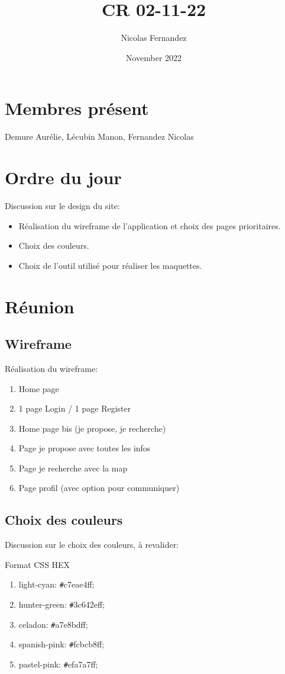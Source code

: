 \documentclass{report}
\title{CR 02-11-22}
\author{Nicolas Fernandez}
\date{November 2022}
\begin{document}
\maketitle

\section{Membres présent}
Demure Aurélie, Lécubin Manon, Fernandez Nicolas

\section{Ordre du jour}

Discussion sur le design du site:

\begin{itemize}
    \item Réalisation du wireframe de l'application et choix des pages prioritaires.
    \item Choix des couleurs.
    \item Choix de l'outil utilisé pour réaliser les maquettes.
\end{itemize}

\section{Réunion}
\subsection{Wireframe}

Réalisation du wireframe:
\begin{enumerate}
    \item Home page
    \item 1 page Login / 1 page Register
    \item Home page bis (je propose, je recherche)
    \item Page je propose avec toutes les infos
    \item Page je recherche avec la map
    \item Page profil (avec option pour communiquer)
\end{enumerate}

\subsection{Choix des couleurs}
Discussion sur le choix des couleurs, à 
revalider:

\vspace{5mm}
Format CSS HEX
\begin{enumerate}
    \item  light-cyan: \verb|#|c7eae4ff;
    \item  hunter-green: \verb|#|3c642eff;
    \item  celadon: \verb|#|a7e8bdff;
    \item  spanish-pink: \verb|#|fcbcb8ff;
    \item  pastel-pink: \verb|#|efa7a7ff;
\end{enumerate}
\end{document}
